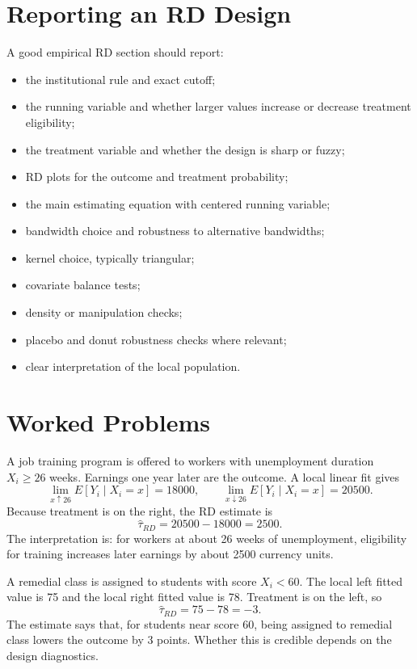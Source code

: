 \section{Reporting an RD Design}

A good empirical RD section should report:
\begin{itemize}
    \item the institutional rule and exact cutoff;
    \item the running variable and whether larger values increase or decrease treatment eligibility;
    \item the treatment variable and whether the design is sharp or fuzzy;
    \item RD plots for the outcome and treatment probability;
    \item the main estimating equation with centered running variable;
    \item bandwidth choice and robustness to alternative bandwidths;
    \item kernel choice, typically triangular;
    \item covariate balance tests;
    \item density or manipulation checks;
    \item placebo and donut robustness checks where relevant;
    \item clear interpretation of the local population.
\end{itemize}

\section{Worked Problems}

\begin{exmp}
A job training program is offered to workers with unemployment duration $X_i\geq 26$ weeks. Earnings one year later are the outcome. A local linear fit gives
\[
    \lim_{x \uparrow 26} E[Y_i\mid X_i=x] = 18000,
    \qquad
    \lim_{x \downarrow 26} E[Y_i\mid X_i=x] = 20500.
\]
Because treatment is on the right, the RD estimate is
\[
    \hat{\tau}_{RD}=20500-18000=2500.
\]
The interpretation is: for workers at about 26 weeks of unemployment, eligibility for training increases later earnings by about 2500 currency units.
\end{exmp}

\begin{exmp}
A remedial class is assigned to students with score $X_i<60$. The local left fitted value is 75 and the local right fitted value is 78. Treatment is on the left, so
\[
    \hat{\tau}_{RD}=75-78=-3.
\]
The estimate says that, for students near score 60, being assigned to remedial class lowers the outcome by 3 points. Whether this is credible depends on the design diagnostics.
\end{exmp}

